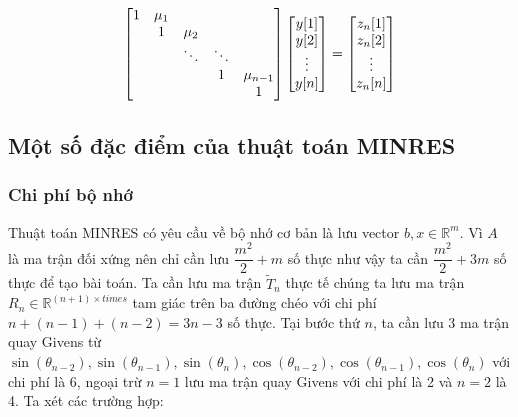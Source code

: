 \documentclass[14pt, a4paper]{article}
\numberwithin{equation}{section}
\numberwithin{algorithm}{section}
\numberwithin{figure}{section}
\numberwithin{dl}{section}
\numberwithin{md}{section}
\numberwithin{bd}{section}
\numberwithin{dn}{section}
\begin{document}
\begin{equation} \label{eq:L-Backward-Substitution}
    \begin{bmatrix} 1 & \mu_1 & \thickspace & \thickspace & \thickspace \\
        \thickspace & 1 & \mu_2 & \thickspace & \thickspace \\
        \thickspace & \thickspace & \ddots & \ddots & \thickspace \\
        \thickspace & \thickspace & \thickspace & 1 & \mu_{n-1} \\
        \thickspace & \thickspace & \thickspace & \thickspace & 1 \end{bmatrix} \begin{bmatrix} y \lbrack 1 \rbrack \\ y \lbrack 2 \rbrack \\ \vdots \\ y \lbrack n \rbrack \end{bmatrix} = \begin{bmatrix} z_n \lbrack 1 \rbrack \\ z_n \lbrack 2 \rbrack \\ \vdots \\ z_n \lbrack n \rbrack \end{bmatrix}
\end{equation}
\subsection{Một số đặc điểm của thuật toán MINRES}

\subsubsection{Chi phí bộ nhớ}

Thuật toán MINRES có yêu cầu về bộ nhớ cơ bản là lưu vector $b, x \in \mathbb{R}^m$. Vì $A$ là ma trận đối xứng nên chỉ cần lưu $\dfrac{m^2}{2} + m$ số thực như vậy ta cần $\dfrac{m^2}{2} + 3m$ số thực để tạo bài toán.
Ta cần lưu ma trận $\widetilde{T}_n$ thực tế chúng ta lưu ma trận $R_n \in \mathbb{R}^{(n+1) \times times}$ tam giác trên ba đường chéo với chi phí $n+(n-1) + (n-2)=3n-3$ số thực. Tại bước thứ $n$, ta cần lưu 3 ma trận quay Givens từ $\sin(\theta_{n-2}), \sin(\theta_{n-1}), \sin(\theta_n), \cos(\theta_{n-2}), \cos(\theta_{n-1}), \cos(\theta_n)$ với chi phí là 6, ngoại trừ $n=1$ lưu ma trận quay Givens với chi phí là 2 và $n=2$ là 4.
Ta xét các trường hợp:
\end{document}
